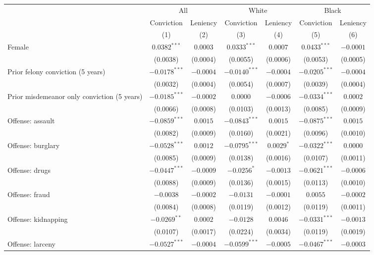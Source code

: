 \begin{tabular}{lcccccc}
\toprule
 & \multicolumn{2}{c}{All} & \multicolumn{2}{c}{White} & \multicolumn{2}{c}{Black} \\
\cmidrule(lr){2-3}\cmidrule(lr){4-5}\cmidrule(lr){6-7}
 & Conviction & Leniency & Conviction & Leniency & Conviction & Leniency \\
 & (1) & (2) & (3) & (4) & (5) & (6) \\
\midrule
Female & $0.0382^{***}$ & $0.0003$ & $0.0333^{***}$ & $0.0007$ & $0.0433^{***}$ & $-0.0001$ \\
 & (0.0038) & (0.0004) & (0.0055) & (0.0006) & (0.0053) & (0.0005) \\
Prior felony conviction (5 years) & $-0.0178^{***}$ & $-0.0004$ & $-0.0140^{***}$ & $-0.0004$ & $-0.0205^{***}$ & $-0.0004$ \\
 & (0.0032) & (0.0004) & (0.0054) & (0.0007) & (0.0039) & (0.0004) \\
Prior misdemeanor only conviction (5 years) & $-0.0185^{***}$ & $-0.0002$ & $0.0000$ & $-0.0006$ & $-0.0334^{***}$ & $0.0002$ \\
 & (0.0066) & (0.0008) & (0.0103) & (0.0013) & (0.0085) & (0.0009) \\
Offense: assault & $-0.0859^{***}$ & $0.0015$ & $-0.0843^{***}$ & $0.0015$ & $-0.0875^{***}$ & $0.0015$ \\
 & (0.0082) & (0.0009) & (0.0160) & (0.0021) & (0.0096) & (0.0010) \\
Offense: burglary & $-0.0528^{***}$ & $0.0012$ & $-0.0795^{***}$ & $0.0029^{*}$ & $-0.0322^{***}$ & $0.0000$ \\
 & (0.0085) & (0.0009) & (0.0138) & (0.0016) & (0.0107) & (0.0011) \\
Offense: drugs & $-0.0447^{***}$ & $-0.0009$ & $-0.0256^{*}$ & $-0.0013$ & $-0.0621^{***}$ & $-0.0006$ \\
 & (0.0088) & (0.0009) & (0.0136) & (0.0015) & (0.0113) & (0.0010) \\
Offense: fraud & $-0.0038$ & $-0.0002$ & $-0.0131$ & $-0.0001$ & $0.0055$ & $-0.0002$ \\
 & (0.0084) & (0.0008) & (0.0119) & (0.0012) & (0.0119) & (0.0011) \\
Offense: kidnapping & $-0.0269^{**}$ & $0.0002$ & $-0.0128$ & $0.0046$ & $-0.0331^{***}$ & $-0.0013$ \\
 & (0.0107) & (0.0017) & (0.0224) & (0.0034) & (0.0119) & (0.0019) \\
Offense: larceny & $-0.0527^{***}$ & $-0.0004$ & $-0.0599^{***}$ & $-0.0005$ & $-0.0467^{***}$ & $-0.0003$ \\

\end{tabular}
